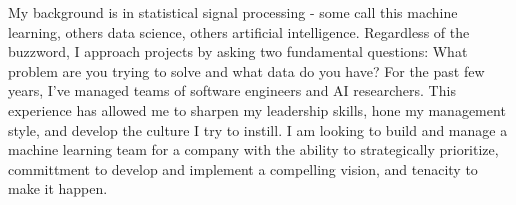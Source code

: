 

\begin{cvparagraph}

  My background is in statistical signal processing - some call this machine
  learning, others data science, others artificial intelligence. Regardless of
  the buzzword, I approach projects by asking two fundamental questions: What
  problem are you trying to solve and what data do you have? For the
  past few years, I've managed teams of software engineers and AI researchers.
  This experience has allowed me to sharpen my leadership skills, hone my
  management style, and develop the culture I try to instill. I am looking to
  build and manage a machine learning team for a company with the ability to
  strategically prioritize, committment to develop and implement a
  compelling vision, and tenacity to make it happen.
\end{cvparagraph}



